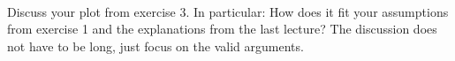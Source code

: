  \\
Discuss your plot from exercise 3.
In particular: How does it fit your assumptions from exercise 1 and the
explanations from the last lecture?
The discussion does not have to be long, just focus on the valid arguments.
